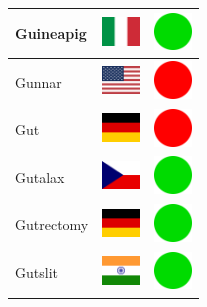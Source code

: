 \documentclass[12pt, a4paper, twoside]{report}
\begin{document}
\begin{center}
\begin{longtable}{|p{5cm}|p{2cm}|p{2cm}|}
 Guineapig                                                  & \includegraphics[width=1cm]{../4x3/it} &   \includegraphics[width=1cm]{../likes/y} \\ \hline
 Gunnar                                                     & \includegraphics[width=1cm]{../4x3/us} &   \includegraphics[width=1cm]{../likes/n} \\ \hline
 Gut                                                        & \includegraphics[width=1cm]{../4x3/de} &   \includegraphics[width=1cm]{../likes/n} \\ \hline
 Gutalax                                                    & \includegraphics[width=1cm]{../4x3/cz} &   \includegraphics[width=1cm]{../likes/y} \\ \hline
 Gutrectomy                                                 & \includegraphics[width=1cm]{../4x3/de} &   \includegraphics[width=1cm]{../likes/y} \\ \hline
 Gutslit                                                    & \includegraphics[width=1cm]{../4x3/in} &   \includegraphics[width=1cm]{../likes/y} \\ \hline

\end{longtable}
\end{center}
\end{document}
